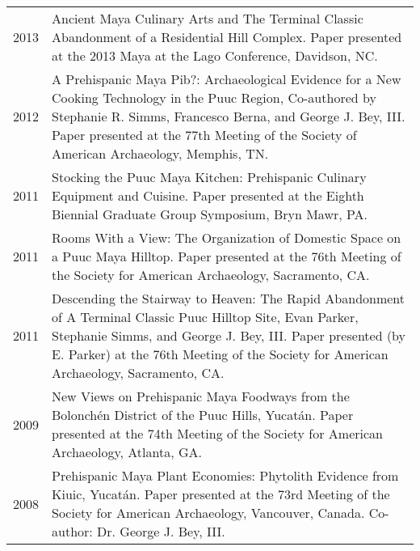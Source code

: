 \documentclass[10pt,centered]{res} %
\begin{document}
\begin{resume}
\begin{tabular}{p{.5in}p{5.25in}<{\raggedright\arraybackslash}}
2013 & Ancient Maya Culinary Arts and The Terminal Classic Abandonment of a Residential Hill Complex. Paper presented at the 2013 Maya at the Lago Conference, Davidson, NC. \\
2012 & A Prehispanic Maya Pib?: Archaeological Evidence for a New Cooking Technology in the Puuc Region, Co-authored by Stephanie R. Simms, Francesco Berna, and George J. Bey, III. Paper presented at the 77th Meeting of the Society of American Archaeology, Memphis, TN.\\
2011 & Stocking the Puuc Maya Kitchen: Prehispanic Culinary Equipment and Cuisine. Paper presented at the Eighth Biennial Graduate Group Symposium, Bryn Mawr, PA.\\
2011 & Rooms With a View: The Organization of Domestic Space on a Puuc Maya Hilltop. Paper presented at the 76th Meeting of the Society for American Archaeology, Sacramento, CA.\\
2011  & Descending the Stairway to Heaven: The Rapid Abandonment of A Terminal Classic Puuc Hilltop Site, Evan Parker, Stephanie Simms, and George J. Bey, III. Paper presented (by E. Parker) at the 76th Meeting of the Society for American Archaeology, Sacramento, CA.\\
2009 & New Views on Prehispanic Maya Foodways from the Bolonch\'{e}n District of the Puuc Hills, Yucat\'{a}n. Paper presented at the 74th Meeting of the Society for American Archaeology, Atlanta, GA.\\
2008 & Prehispanic Maya Plant Economies: Phytolith Evidence from Kiuic, Yucat\'{a}n. Paper presented at the 73rd Meeting of the Society for American Archaeology, Vancouver, Canada. Co-author: Dr. George J. Bey, III.\\
\end{tabular}


\end{resume}
\end{document}
